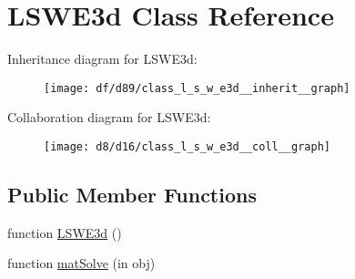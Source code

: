 \hypertarget{class_l_s_w_e3d}{}\section{L\+S\+W\+E3d Class Reference}
\label{class_l_s_w_e3d}


Inheritance diagram for L\+S\+W\+E3d\+:
\nopagebreak
\begin{figure}[H]
\begin{center}
\leavevmode
\texttt{[image: df/d89/class\_l\_s\_w\_e3d\_\_inherit\_\_graph]}
\end{center}
\end{figure}


Collaboration diagram for L\+S\+W\+E3d\+:
\nopagebreak
\begin{figure}[H]
\begin{center}
\leavevmode
\texttt{[image: d8/d16/class\_l\_s\_w\_e3d\_\_coll\_\_graph]}
\end{center}
\end{figure}
\subsection*{Public Member Functions}
\begin{DoxyCompactItemize}
\item 
function \hyperlink{class_l_s_w_e3d_a325d8f45714b72559836cdc6f31b38a3}{L\+S\+W\+E3d} ()
\item 
function \hyperlink{class_l_s_w_e3d_a01afc84d1c4aa6d921dc3780153a2f79}{mat\+Solve} (in obj)
\end{DoxyCompactItemize}
